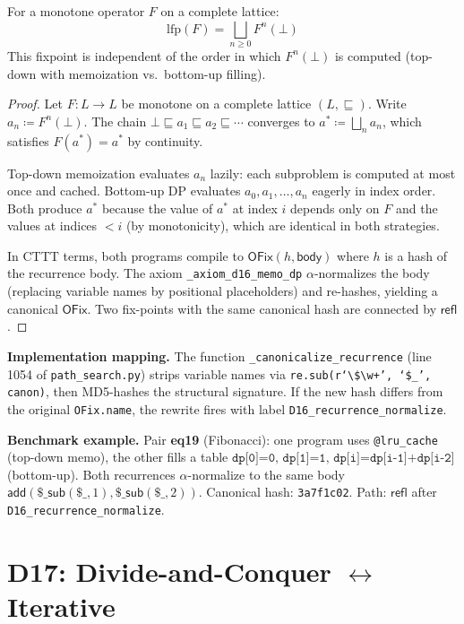 \begin{theorem}
\label{thm:d16-lfp}
For a monotone operator $F$ on a complete lattice:
\[
  \mathrm{lfp}(F) = \bigsqcup_{n \geq 0} F^n(\bot)
\]
This fixpoint is independent of the order in which $F^n(\bot)$ is
computed (top-down with memoization vs.\ bottom-up filling).
\end{theorem}

\begin{proof}
Let $F : L \to L$ be monotone on a complete lattice $(L, \sqsubseteq)$.
Write $a_n \coloneqq F^n(\bot)$.  The chain
$\bot \sqsubseteq a_1 \sqsubseteq a_2 \sqsubseteq \cdots$ converges
to $a^* \coloneqq \bigsqcup_n a_n$, which satisfies $F(a^*) = a^*$
by continuity.

Top-down memoization evaluates $a_n$ lazily: each subproblem is
computed at most once and cached.  Bottom-up DP evaluates $a_0, a_1,
\ldots, a_n$ eagerly in index order.  Both produce $a^*$ because the
value of $a^*$ at index $i$ depends only on $F$ and the values at
indices $< i$ (by monotonicity), which are identical in both strategies.

In CTTT terms, both programs compile to $\mathsf{OFix}(h, \mathsf{body})$
where $h$ is a hash of the recurrence body.  The axiom
\texttt{\_axiom\_d16\_memo\_dp} $\alpha$-normalizes the body (replacing
variable names by positional placeholders) and re-hashes, yielding a
canonical $\mathsf{OFix}$.  Two fix-points with the same canonical
hash are connected by $\mathsf{refl}$.
\end{proof}

\textbf{Implementation mapping.}
The function \texttt{\_canonicalize\_recurrence} (line 1054 of
\texttt{path\_search.py}) strips variable names via
\texttt{re.sub(r`\textbackslash\$\textbackslash w+', `\$\_', canon)},
then MD5-hashes the structural signature.  If the new hash differs
from the original \texttt{OFix.name}, the rewrite fires with label
\texttt{D16\_recurrence\_normalize}.

\textbf{Benchmark example.}
Pair \textbf{eq19} (Fibonacci): one program uses
\texttt{@lru\_cache} (top-down memo), the other fills a table
$\texttt{dp[0]=0, dp[1]=1, dp[i]=dp[i-1]+dp[i-2]}$ (bottom-up).
Both recurrences $\alpha$-normalize to the same body
$\mathsf{add}(\$\_\mathsf{sub}(\$\_,1), \$\_\mathsf{sub}(\$\_,2))$.
Canonical hash: \texttt{3a7f1c02}.  Path: $\mathsf{refl}$ after
\texttt{D16\_recurrence\_normalize}.

\section{D17: Divide-and-Conquer $\leftrightarrow$ Iterative}
\label{sec:d17-assoc}

